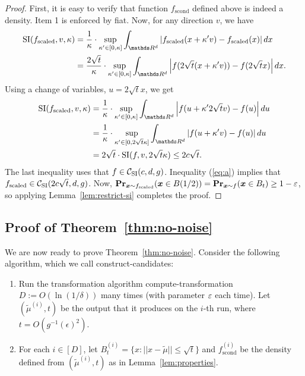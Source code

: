 \begin{proof}
First, it is easy to verify that function $f_{\mathrm{scond}}$ defined above is indeed a density. Item 1 
is enforced by fiat.
Now, for any direction $v$, we have
\begin{align*}
\si(f_{\mathrm{scaled}},v,\kappa) 
 & =
{\frac 1 \kappa} \cdot \sup_{\kappa' \in [0,\kappa]} \int_{\R^d} \left|f_{\mathrm{scaled}}(x+ \kappa'  v) - f_{\mathrm{scaled}}(x)\right| dx \\
 & =
{\frac{2\sqrt{t}}\kappa} \cdot \sup_{\kappa' \in [0,\kappa]} \int_{\R^d} \left|f(2 \sqrt{t} (x+ \kappa'  v)) - f(2 \sqrt{t} x)\right| dx. \\
\end{align*}
Using a change of variables, $u = 2 \sqrt{t} x$, we get
\begin{align}
\si(f_{\mathrm{scaled}},v,\kappa) 
 & = {\frac 1 \kappa} \cdot \sup_{\kappa' \in [0,\kappa]} \int_{\R^d} \left|f(u+ \kappa' 2 \sqrt{t}  v) - f(u)\right| du \nonumber \\
 & = {\frac 1 \kappa} \cdot \sup_{\kappa' \in [0,2 \sqrt{t} \kappa]} \int_{\R^d} \left|f(u+ \kappa'   v) - f(u)\right| du \nonumber \\
 & = 2 \sqrt{t} \cdot \si(f,v,2 \sqrt{t} \kappa) \le 2 c \sqrt{t}. \label{eq:a}
\end{align}
The last inequality uses that $f \in {\mathcal C}_{\mathrm{SI}}(c,d,g)$. Inequality (\ref{eq:a})  implies that $f_{\mathrm{scaled}} \in  {\mathcal C}_{\mathrm{SI}}(2c\sqrt{t},d,g)$.
Now, 
$\operatorname{{\bf Pr}}_{\boldsymbol{x} \sim f_{\mathrm{scaled}}}(\boldsymbol{x} \in B(1/2)) = \operatorname{{\bf Pr}}_{\boldsymbol{x} \sim f}(\boldsymbol{x} \in B_t) \geq 1 - \varepsilon$, so
applying Lemma~\ref{lem:restrict-si} completes the proof.
\end{proof} 


\subsection{Proof of Theorem~\ref{thm:no-noise}} \label{sec:proof-of-no-noise}

We are now ready to prove Theorem~\ref{thm:no-noise}.  Consider the following algorithm, which we call 
\textsf{construct-candidates}:

\begin{enumerate}

\item Run the transformation algorithm \textsf{compute-transformation} $D := O (\ln(1/\delta))$ many times (with parameter $\varepsilon$ each time).  Let $(\tilde{\mu}^{(i)},t)$ be the output that it produces on the $i$-th run, where $t=O(g^{-1}(\epsilon)^2)$. 

\item For each $i \in [D]$,  let
$B_t^{(i)} = \{ x : || x - \tilde{\mu} || \leq \sqrt{t} \}$ and
$
f^{(i)}_{\mathrm{scond}}
$
be the density defined from $(\tilde{\mu}^{(i)},t)$ as in Lemma~\ref{lem:properties}.
\end{enumerate}

